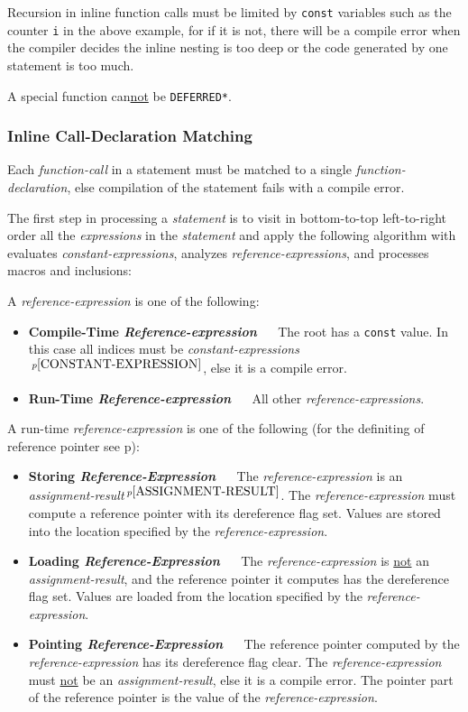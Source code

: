 \documentclass[12pt]{article}
\newcommand{\key}[1]{{\rm \bfseries #1}}
\newcommand{\pagref}[1]{p\pageref{#1}}
\newcommand{\pagnote}[1]{$\,^{p\pageref{#1}}$}
\begin{document}
Recursion in inline function calls must be limited by {\tt const}
variables such as the counter {\tt i} in the above example,
for if it is not, there
will be a compile error when the compiler decides the inline nesting
is too deep or the code generated by one statement is too much.

A special function can\underline{not} be {\tt *DEFERRED*}.

\subsubsection{Inline Call-Declaration Matching}
\label{INLINE-CALL-DECLARATION-MATCHING}

Each {\em function-call} in a statement must be matched to a single
{\em function-declaration}, else compilation of the statement fails
with a compile error.

The first step in processing
a {\em statement} is to visit in bottom-to-top left-to-right order
all the {\em expressions} in the {\em statement} and apply the following
algorithm with evaluates {\em constant-expressions}, analyzes
{\em reference-expressions}, and processes macros and inclusions:

A {\em reference-expression} is one of the following:
\begin{itemize}
\item \key{Compile-Time {\em Reference-expression}} ~~
The root has a {\tt const} value.  In this
case all indices must be
{\em constant-expressions}\pagnote{CONSTANT-EXPRESSION}, else it is
a compile error.
\item \key{Run-Time {\em Reference-expression}} ~~
All other {\em reference-expressions}.
\end{itemize}

A run-time {\em reference-expression} is one of the following
(for the definiting of reference pointer see \pagref{REFERENCE-POINTER}):
\begin{itemize}
\item \key{Storing {\em Reference-Expression}} ~~
The {\em reference-expression} is an
{\em assignment-re\-sult}\pagnote{ASSIGNMENT-RESULT}.
The {\em reference-expression} must compute a reference pointer with its
dereference flag set.
Values are stored into the location specified by the {\em reference-expression}.
\item \key{Loading {\em Reference-Expression}} ~~
The {\em reference-expression} is \underline{not} an
{\em assignment-result}, and the reference pointer it computes has the
dereference flag set.
Values are loaded from the
location specified by the {\em reference-expression}.
\item \key{Pointing {\em Reference-Expression}} ~~
The reference pointer computed by the {\em reference-expression}
has its dereference flag clear.
The {\em reference-expression} must \underline{not} be an
{\em assignment-result}, else it is a compile error.
The pointer part of the reference pointer is the value of the
{\em reference-expression}.
\end{itemize}
\end{document}
